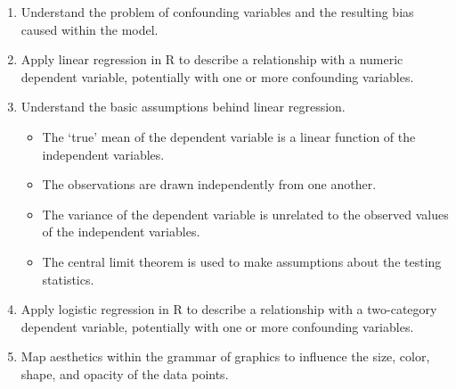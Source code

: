 \documentclass[11pt]{article}
\begin{document}
\begin{enumerate}
\item Understand the problem of confounding variables and the resulting bias
caused within the model.

\item Apply linear regression in R to describe a relationship with a numeric
dependent variable, potentially with one or more  confounding variables.

\item Understand the basic assumptions behind linear regression.
\begin{itemize}
\renewcommand{\labelitemi}{{\textcolor{dark}{{\tiny $\blacksquare$}}}}
\item The `true' mean of the dependent variable is a linear function of the
independent variables.
\item The observations are drawn independently from one another.
\item The variance of the dependent variable is unrelated to the observed
values of the independent variables.
\item The central limit theorem is used to make assumptions about the testing
statistics.
\end{itemize}

\item Apply logistic regression in R to describe a relationship with a
two-category dependent variable, potentially with one or more confounding
variables.

\item Map aesthetics within the grammar of graphics to influence the size,
color, shape, and opacity of the data points.

\end{enumerate}
\end{document}
